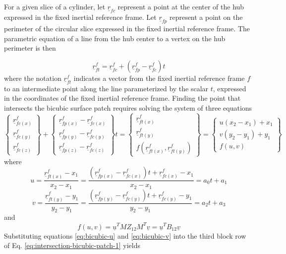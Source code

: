 \documentclass[
10pt, %
a4paper, %
oneside, %
headinclude,footinclude, %
BCOR5mm, %
]{scrartcl}
\begin{document}
For a given slice of a cylinder, let $\underline{r}_{fc}$ represent a point at the center of the hub expressed in the fixed inertial reference frame. Let $\underline{r}_{fp}$ represent a point on the perimeter of the circular slice expressed in the fixed inertial reference frame. The parametric equation of a line from the hub center to a vertex on the hub perimeter is then

\begin{equation}
  \label{eq:parametric-eqn-line}
\underline{r}_{ft}^f = \underline{r}_{fc}^f + (\underline{r}_{fp}^f - \underline{r}_{fc}^f) t
\end{equation}
where the notation $\underline{r}_{ft}^f$ indicates a vector from the fixed inertial reference frame $f$ to an intermediate point along the line parameterized by the scalar $t$, expressed in the coordinates of the fixed inertial reference frame. Finding the point that intersects the bicubic surface patch requires solving the system of three equations
\begin{equation}
  \label{eq:intersection-bicubic-patch-1}
\begin{Bmatrix}
  \underline{r}_{fc(x)}^f\\
  \underline{r}_{fc(y)}^f\\
  \underline{r}_{fc(z)}^f
\end{Bmatrix} +
\begin{Bmatrix}
  \underline{r}_{fp(x)}^f - \underline{r}_{fc(x)}^f\\
  \underline{r}_{fp(y)}^f - \underline{r}_{fc(y)}^f\\
  \underline{r}_{fp(z)}^f - \underline{r}_{fc(z)}^f
\end{Bmatrix} t =
\begin{Bmatrix}
  \underline{r}_{ft(x)}^f\\
  \underline{r}_{ft(y)}^f\\
  f(\underline{r}_{ft(x)}^f,\underline{r}_{ft(y)}^f)
\end{Bmatrix} =
\begin{Bmatrix} u (x_2 - x_1 ) + x_1 \\ v (y_2 - y_1) + y_1 \\ f(u, v)   \end{Bmatrix}
\end{equation}
where
\begin{equation}
  \label{eq:bicubic-u}
u=
\frac{\underline{r}_{ft(x)}^f-x_1}{x_2 - x_1}
= \frac{\left(\underline{r}_{fp(x)}^f - \underline{r}_{fc(x)}^f\right) t + \underline{r}_{fc(x)}^f - x_1}{x_2 - x_1} = a_0t + a_1
\end{equation}
\begin{equation}
    \label{eq:bicubic-v}
v=\frac{\underline{r}_{ft(y)}^f-y_1}{y_2 - y_1} =
\frac{\left(\underline{r}_{fp(y)}^f - \underline{r}_{fc(y)}^f\right) t  + \underline{r}_{fc(y)}^f - y_1}{y_2 - y_1} = a_2 t + a_3
\end{equation}
and
\begin{equation}
  f(u,v) = \underline{u}^TMZ_{12}M^T\underline{v} = \underline{u}^T B_{12} \underline{v}
\end{equation}
Substituting equations \eqref{eq:bicubic-u} and \eqref{eq:bicubic-v} into the third block row of Eq. \eqref{eq:intersection-bicubic-patch-1} yields
\end{document}
